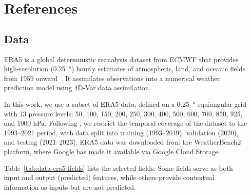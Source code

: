 \clearpage
\section*{References}

\printbibliography[heading=none]

\begin{subappendices}

\clearpage
\section{Data} \label{app:appa-data}

ERA5 is a global deterministic reanalysis dataset from ECMWF that provides high-resolution (\qty{0.25}{\degree}) hourly estimates of atmospheric, land, and oceanic fields from 1959 onward~\cite{hersbach2020era5}. It assimilates observations into a numerical weather prediction model using 4D-Var data assimilation.

In this work, we use a subset of ERA5 data, defined on a \qty{0.25}{\degree} equiangular grid with 13 pressure levels: 50, 100, 150, 200, 250, 300, 400, 500, 600, 700, 850, 925, and 1000 \unit{\hecto\pascal}. Following \textcite{lam2023learning}, we restrict the temporal coverage of the dataset to the 1993--2021 period, with data split into training (1993--2019), validation (2020), and testing (2021--2023). ERA5 data was downloaded from the WeatherBench2 \cite{rasp2024weatherbench} platform, where Google has made it available via Google Cloud Storage.

Table~\ref{tab:data-era5-fields} lists the selected fields. Some fields serve as both input and output (predicted) features, while others provide contextual information as inputs but are not predicted.


\end{subappendices}
